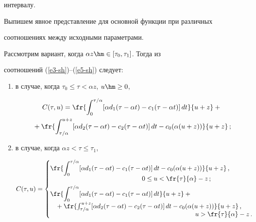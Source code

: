 интервалу. 

  

  Выпишем явное представление для основной функции при различных 

соотношениях между исходными параметрами.

  

  Рассмотрим вариант, когда $\alpha z \hm\in [\tau_0, \tau_1]$. Тогда из 

соотношений (\ref{e3-sh})--(\ref{e5-sh}) следует: 

  \begin{enumerate}[(1)]

\item в случае, когда $\tau_0\leq\tau<\alpha z$, $u\hm\geq0$, 

\begin{multline*}

C(\tau,u)=\fr{\int\nolimits_0^{\tau/\alpha} [\alpha d_1(\tau-\alpha t) -c_1(\tau-\alpha 

t)]\,dt} {u+z}+{}\\

{}+\fr{\int\nolimits^{u+z}_{\tau/\alpha} [\alpha d_2(\tau-\alpha t) -

c_2(\tau-\alpha t)]\,dt-c_0(\alpha(u+z))}{u+z}\,;


\end{multline*}

\item в случае, когда $\alpha z <\tau\leq \tau_1$,

\begin{equation*}

C(\tau,u)=\begin{cases}

\displaystyle \fr{\int\nolimits_0^{\tau/\alpha} [\alpha d_1(\tau-\alpha t) -c_1(\tau-

\alpha t)]\,dt-c_0(\alpha(u+z))}{u+z}\,, \\[-3pt]

\hspace*{50mm}0\leq u<\fr{\tau}{\alpha}-z\,;\\[3pt]

\displaystyle \fr{\int\nolimits^{\tau/\alpha}_0 [\alpha d_1(\tau-\alpha t) -

c_1(\tau-\alpha t)]\,dt}{u+z} +{}\\ %

\hspace*{3mm}{}+ \fr{\int\nolimits^{u+z}_{\tau/\alpha} 

[\alpha d_2(\tau-\alpha t) -c_2(\tau-\alpha t)]\,dt-c_0(\alpha(u+z))}{u+z}\,, \\[-3pt]

\hspace*{79mm}u>\fr{\tau}{\alpha}-z\,.

\end{cases}


\end{equation*}

  \end{enumerate}

